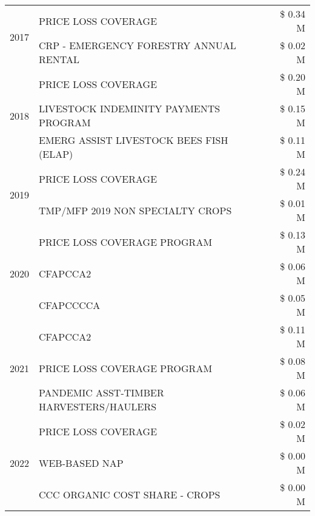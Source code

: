 \begin{tabular}{llr}
\cline{1-3}
\multirow[t]{2}{*}{2017} & PRICE LOSS COVERAGE & \$ 0.34 M \\
 & CRP - EMERGENCY FORESTRY ANNUAL RENTAL & \$ 0.02 M \\
\cline{1-3}
\multirow[t]{3}{*}{2018} & PRICE LOSS COVERAGE & \$ 0.20 M \\
 & LIVESTOCK INDEMINITY PAYMENTS PROGRAM & \$ 0.15 M \\
 & EMERG ASSIST LIVESTOCK BEES FISH (ELAP) & \$ 0.11 M \\
\cline{1-3}
\multirow[t]{2}{*}{2019} & PRICE LOSS COVERAGE & \$ 0.24 M \\
 & TMP/MFP 2019 NON SPECIALTY CROPS & \$ 0.01 M \\
\cline{1-3}
\multirow[t]{3}{*}{2020} & PRICE LOSS COVERAGE PROGRAM & \$ 0.13 M \\
 & CFAPCCA2 & \$ 0.06 M \\
 & CFAPCCCCA & \$ 0.05 M \\
\cline{1-3}
\multirow[t]{3}{*}{2021} & CFAPCCA2 & \$ 0.11 M \\
 & PRICE LOSS COVERAGE PROGRAM & \$ 0.08 M \\
 & PANDEMIC ASST-TIMBER HARVESTERS/HAULERS & \$ 0.06 M \\
\cline{1-3}
\multirow[t]{3}{*}{2022} & PRICE LOSS COVERAGE & \$ 0.02 M \\
 & WEB-BASED NAP & \$ 0.00 M \\
 & CCC ORGANIC COST SHARE - CROPS & \$ 0.00 M \\
\cline{1-3}
\bottomrule
\end{tabular}
